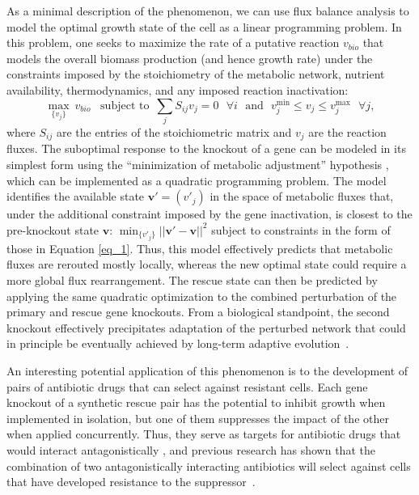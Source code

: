 \documentclass[
preprint,
superscriptaddress,
aps,
prl,
]{revtex4-1}
\begin{document}
As a minimal description of the phenomenon,  we can use flux balance analysis \cite{edwards2000escherichia} to model the optimal growth state of the cell as a linear programming problem.
In this problem, one seeks to maximize the rate of a putative reaction $v_{bio}$  that models the overall biomass production (and hence growth rate) under the constraints imposed by the stoichiometry of the metabolic network, nutrient availability, thermodynamics, and any imposed reaction inactivation: 
\begin{equation}
\max_{\{v_j\}}~  v_{bio}  \mbox{ ~subject to~   $\sum_{j}$} S_{ij} v_{j} = 0  \mbox{ ~$\forall i$} \mbox{ ~and~ } v_j^{\min} \le v_j \le v_j^{\max} \mbox{ ~$\forall j$},
\label{eq_1}
\end{equation} 
where $S_{ij}$ are the entries of the stoichiometric matrix and $v_j$ are the reaction fluxes.
The suboptimal response to the knockout of a gene can be modeled in its simplest form using the 
{\color{black} ``minimization of metabolic adjustment'' hypothesis}
\cite{segre2002analysis}, which can be implemented as a  
 {\color{black} quadratic} 
programming problem.
{\color{black}
The model}
 identifies the available state ${\boldsymbol  v'}= (v'_j)$ in the space of metabolic fluxes  that, under the additional constraint imposed by the gene inactivation, is closest to the pre-knockout state  ${\boldsymbol  v}$:  $  \min_{\{v'_j\}} || {\boldsymbol v'} -{\boldsymbol  v}||^2  $ subject to constraints in the form of those in Equation \ref{eq_1}. 
 Thus, %
this model
effectively predicts that metabolic fluxes are rerouted mostly locally, whereas the new optimal state could require a more global flux rearrangement. The rescue state can then be predicted by applying the same quadratic optimization to the combined perturbation of the primary and rescue gene knockouts. From a biological standpoint, the second knockout effectively precipitates adaptation of the perturbed network that could in principle be eventually achieved by long-term adaptive evolution~\cite{cornelius2011dispensability}. 

An interesting potential application of this phenomenon is to the development of pairs of antibiotic drugs that can select against resistant cells. Each gene knockout of a synthetic rescue pair has the potential to inhibit growth when implemented in isolation, but one of them suppresses the impact of the other when applied concurrently. Thus, they serve as targets for antibiotic drugs that would interact antagonistically \cite{motter2010improved}, and previous research has shown that the combination of two antagonistically interacting antibiotics  will select against cells that have developed resistance to the suppressor~\cite{chait2007antibiotic}.
\end{document}
